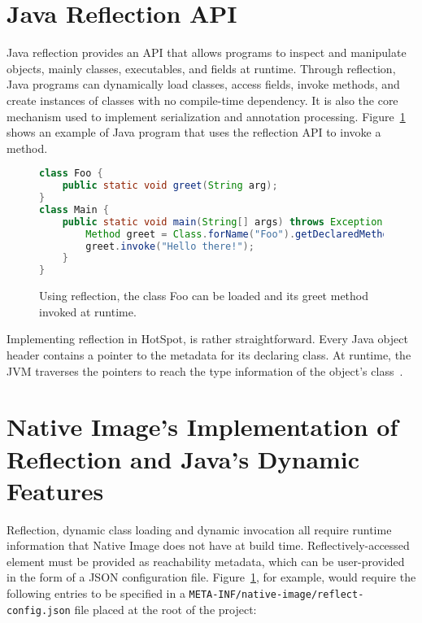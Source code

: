 \section{Java Reflection API}
Java reflection provides an API that allows programs to inspect and manipulate objects, mainly classes, executables, and fields at runtime.
Through reflection, Java programs can dynamically load classes, access fields, invoke methods, and create instances of classes with no compile-time dependency. It is also the core mechanism used to implement serialization and annotation processing. Figure~\ref{fig:reflective_calls} shows an example of Java program that uses the reflection API to invoke a method.

\begin{figure}[ht]
    \centering
\begin{lstlisting}[language=Java]
class Foo {
    public static void greet(String arg);
}
class Main {
    public static void main(String[] args) throws Exception {
        Method greet = Class.forName("Foo").getDeclaredMethod("greet");
        greet.invoke("Hello there!");
    }  
}
\end{lstlisting}
    \caption{Using reflection, the class Foo can be loaded and its greet method invoked at runtime.}
    \label{fig:reflective_calls}
\end{figure}

Implementing reflection in HotSpot, is rather straightforward. Every Java object header contains a pointer to the metadata for its declaring class. At runtime, the JVM traverses the pointers to reach the type information of the object's class~\cite{evans_ben_reflection_nodate}.



\section{Native Image's Implementation of Reflection and Java's Dynamic Features}
Reflection, dynamic class loading and dynamic invocation all require runtime information that Native Image does not have at build time.
Reflectively-accessed element must be provided as reachability metadata, which can be user-provided in the form of a JSON configuration file.  
Figure~\ref{fig:reflective_calls}, for example, would require the following entries to be specified in a \verb|META-INF/native-image/reflect-config.json| file placed at the root of the project:

